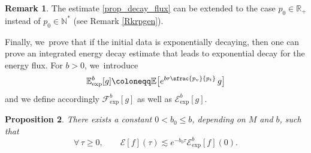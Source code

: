 \documentclass[JEP,XML,SOM,Unicode,published]{cedram}
\theoremstyle{plain}
\newtheorem{proposition}{Proposition}[section]
\theoremstyle{definition}
\newtheorem{remark}[proposition]{Remark}
\newcommand\R{{\mathbb{R}}}
\begin{document}
\begin{remark}
The estimate \eqref{prop_decay_flux} can be extended to the case $p_0\in \R_+$ instead of $p_0\in \mathbb{N}^*$ (see Remark \ref{Rkrpgen}).
\end{remark}

Finally, we~prove that if the initial data is exponentially decaying, then one can prove an integrated energy decay estimate that leads to exponential decay for the energy flux. For $b>0$, we~introduce\vspace*{-3pt}
\[
\mathbb{E}_{\mathrm{exp}}^b[g] \coloneqq \mathbb{E} \bigl[ e^{br \sfrac{p_v}{p_t}} \, g \bigr]
\]
and we define accordingly $\mathcal{F}_{\mathrm{exp}}^b [g]$ as well as $\mathcal{E}_{\mathrm{exp}}^b[g]$.

\begin{proposition}\label{Proexpodec}
There exists a constant $0< b_0 \leq b$, depending on $M$ and $b$, such that\vspace*{-5pt}
\[
\forall \, \tau \geq 0, \qquad \mathcal{E}[f](\tau) \lesssim e^{-b_0 \tau} \mathcal{E}_{\mathrm{exp}}^b[f](0).
\]
\end{proposition}
\end{document}
